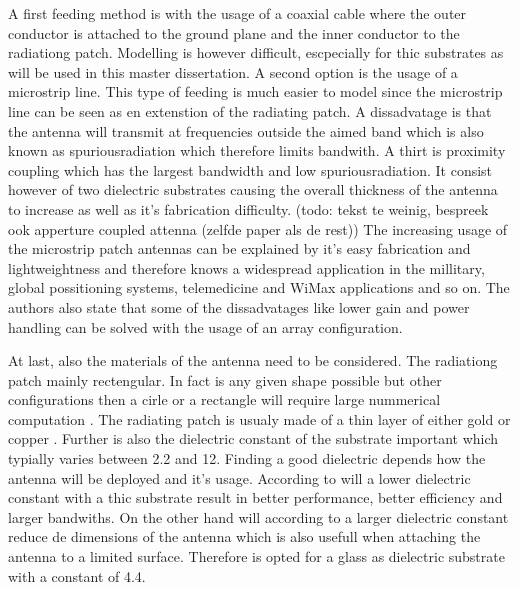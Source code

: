 A first feeding method is with the usage of a coaxial cable where the outer conductor is attached to the ground plane and the inner conductor to the radiationg patch. Modelling is however difficult, escpecially for thic substrates as will be used in this master dissertation.
A second option is the usage of a microstrip line. This type of feeding is much easier to model since the microstrip line can be seen as en extenstion of the radiating patch. A dissadvatage is that the antenna will transmit at frequencies outside the aimed band which
is also known as \gls{spuriousradiation} which therefore  limits bandwith.
A thirt is proximity coupling which has the largest bandwidth and low \gls{spuriousradiation}. It consist however of two dielectric substrates causing the overall thickness
of the antenna to increase as well as it's fabrication difficulty.
(todo: tekst te weinig, bespreek ook apperture coupled attenna (zelfde paper als de rest))
The increasing usage of the microstrip patch antennas can be explained by it's easy fabrication and lightweightness and therefore knows a widespread application in the millitary, global possitioning systems, telemedicine and WiMax applications and so on.
The authors also state that some of the dissadvatages like lower gain and power handling can be solved with the usage of an array configuration.

At last, also the materials of the antenna need to be considered. The radiationg patch mainly rectengular. In fact is any given shape possible but other configurations
then a cirle or a rectangle will require large nummerical computation \cite{J14_antennadesign}. The radiating patch is usualy made of a thin layer of either gold or copper \cite{J14_antennadesign,J15_antennadesign}. 
Further is also the dielectric constant of the substrate important which typially varies between 2.2 and 12. Finding a good dielectric depends how the antenna will be deployed and it's usage. According to  \cite{J15_antennadesign} will a lower
dielectric constant with a thic substrate result in better performance, better efficiency and larger bandwiths. On the other hand will according to \cite{J14_antennadesign} a larger dielectric constant reduce de dimensions of the antenna which is also usefull when attaching the 
antenna to a limited surface. Therefore is opted for a glass as dielectric substrate with a constant of 4.4.

